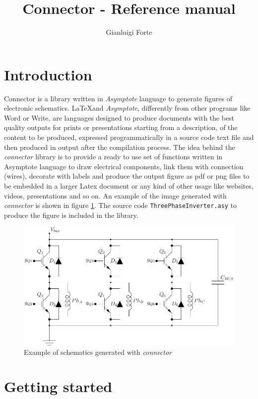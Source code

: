 \documentclass[a4paper,12pt]{report}
\title{Connector - Reference manual }
\author{Gianluigi Forte}
\begin{document}
\maketitle

\section*{Introduction}

Connector is a library written in \emph{Asymptote} language to generate figures of electronic schematics. \LaTeX and \emph{Asymptote}, differently from other programs like Word or Write, are languages designed to produce documents with the best quality outputs for prints or presentations starting from a description, of the content to be produced, expressed programmatically in a source code text file and then produced in output after the compilation process. The idea behind the \emph{connector} library is to provide a ready to use set of functions written in Asymptote language to draw electrical components, link them with connection (wires), decorate with labels and produce the output figure as pdf or png files to be embedded in a larger Latex document or any kind of other usage like websites, videos, presentations and so on. An example of the image generated with \emph{connector} is shown in figure \ref{threePhaseInverterExample}. The source code \texttt{ThreePhaseInverter.asy} to produce the figure is included in the library.

\begin{figure}[ht]
  \centering
  \includegraphics[width=1.0\textwidth]{ThreePhaseInverter.pdf}
  \caption{Example of schematics generated with \emph{connector}}
  \label{threePhaseInverterExample}
\end{figure}

\section*{Getting started}
\end{document}
